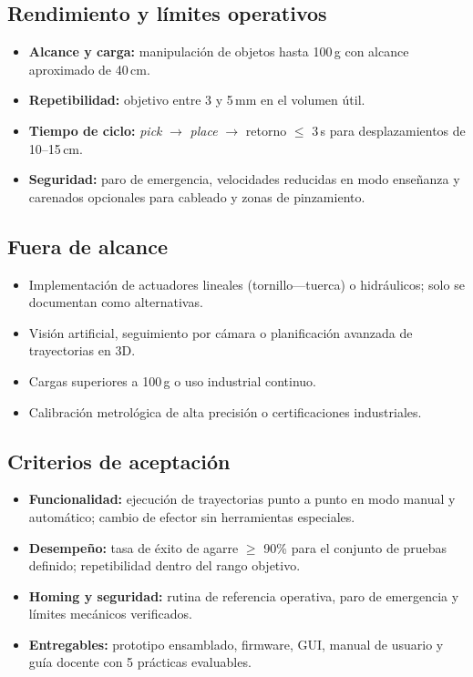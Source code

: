 \subsection{Rendimiento y límites operativos}
\begin{itemize}
  \item \textbf{Alcance y carga:} manipulación de objetos hasta 100\,g con alcance aproximado de 40\,cm.
  \item \textbf{Repetibilidad:} objetivo entre 3 y 5\,mm en el volumen útil.
  \item \textbf{Tiempo de ciclo:} \emph{pick} $\rightarrow$ \emph{place} $\rightarrow$ retorno $\leq$ 3\,s para desplazamientos de 10--15\,cm.
  \item \textbf{Seguridad:} paro de emergencia, velocidades reducidas en modo enseñanza y carenados opcionales para cableado y zonas de pinzamiento.
\end{itemize}

\subsection{Fuera de alcance}
\begin{itemize}
  \item Implementación de actuadores lineales (tornillo---tuerca) o hidráulicos; solo se documentan como alternativas.
  \item Visión artificial, seguimiento por cámara o planificación avanzada de trayectorias en 3D.
  \item Cargas superiores a 100\,g o uso industrial continuo.
  \item Calibración metrológica de alta precisión o certificaciones industriales.
\end{itemize}

\subsection{Criterios de aceptación}
\begin{itemize}
  \item \textbf{Funcionalidad:} ejecución de trayectorias punto a punto en modo manual y automático; cambio de efector sin herramientas especiales.
  \item \textbf{Desempeño:} tasa de éxito de agarre $\geq$ 90\% para el conjunto de pruebas definido; repetibilidad dentro del rango objetivo.
  \item \textbf{Homing y seguridad:} rutina de referencia operativa, paro de emergencia y límites mecánicos verificados.
  \item \textbf{Entregables:} prototipo ensamblado, firmware, GUI, manual de usuario y guía docente con 5 prácticas evaluables.
\end{itemize}

